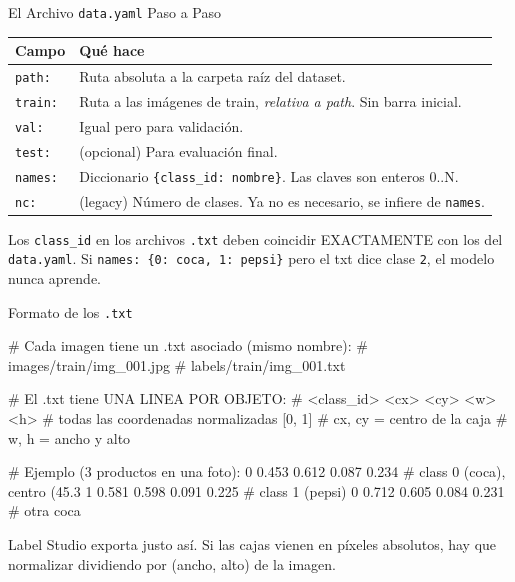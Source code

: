 \begin{frame}[shrink]{El Archivo \texttt{data.yaml} Paso a Paso}
  \vspace{6pt}
  {\footnotesize
  \begin{tabular}{@{}p{2.5cm} p{9.5cm}@{}}
    \toprule
    \textbf{Campo} & \textbf{Qu\'e hace} \\
    \midrule
    \rowcolor{arcaGray}
    \texttt{path:}
    & Ruta absoluta a la carpeta ra\'iz del dataset. \\
    \texttt{train:}
    & Ruta a las im\'agenes de train, \emph{relativa a path}. Sin barra inicial. \\
    \rowcolor{arcaGray}
    \texttt{val:}
    & Igual pero para validaci\'on. \\
    \texttt{test:}
    & (opcional) Para evaluaci\'on final. \\
    \rowcolor{arcaGray}
    \texttt{names:}
    & Diccionario \texttt{\{class\_id: nombre\}}. Las claves son enteros 0..N. \\
    \texttt{nc:}
    & (legacy) N\'umero de clases. Ya no es necesario, se infiere de \texttt{names}. \\
    \bottomrule
  \end{tabular}
  }

  \vspace{10pt}
  \begin{tcolorbox}[colback=arcaRed!8, colframe=arcaRed, boxrule=0.5pt,
    arc=2pt, left=6pt, right=6pt, top=4pt, bottom=4pt]
    {\scriptsize\color{arcaDark}
    \faExclamationTriangle\hspace{4pt} Los \texttt{class\_id} en los archivos
    \texttt{.txt} deben coincidir EXACTAMENTE con los del \texttt{data.yaml}.
    Si \texttt{names: \{0: coca, 1: pepsi\}} pero el txt dice clase \texttt{2},
    el modelo nunca aprende.}
  \end{tcolorbox}
\end{frame}

\begin{frame}{Formato de los \texttt{.txt}}
  \vspace{-4pt}
  \begin{pyblock}
# Cada imagen tiene un .txt asociado (mismo nombre):
#   images/train/img_001.jpg
#   labels/train/img_001.txt

# El .txt tiene UNA LINEA POR OBJETO:
# <class_id> <cx> <cy> <w> <h>
# todas las coordenadas normalizadas [0, 1]
# cx, cy = centro de la caja
# w, h   = ancho y alto

# Ejemplo (3 productos en una foto):
0 0.453 0.612 0.087 0.234     # class 0 (coca), centro (45.3%
1 0.581 0.598 0.091 0.225     # class 1 (pepsi)
0 0.712 0.605 0.084 0.231     # otra coca
  \end{pyblock}

  \vspace{4pt}
  {\scriptsize\color{textMuted}
    \faLightbulb\hspace{4pt} Label Studio exporta justo as\'i.
    Si las cajas vienen en p\'ixeles absolutos, hay que normalizar
    dividiendo por (ancho, alto) de la imagen.}
\end{frame}

